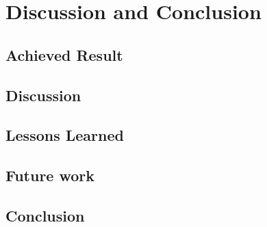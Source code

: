 \chapter{Discussion and Conclusion}

\section{Achieved Result}

\section{Discussion}

\section{Lessons Learned}

\section{Future work}

\section{Conclusion}
